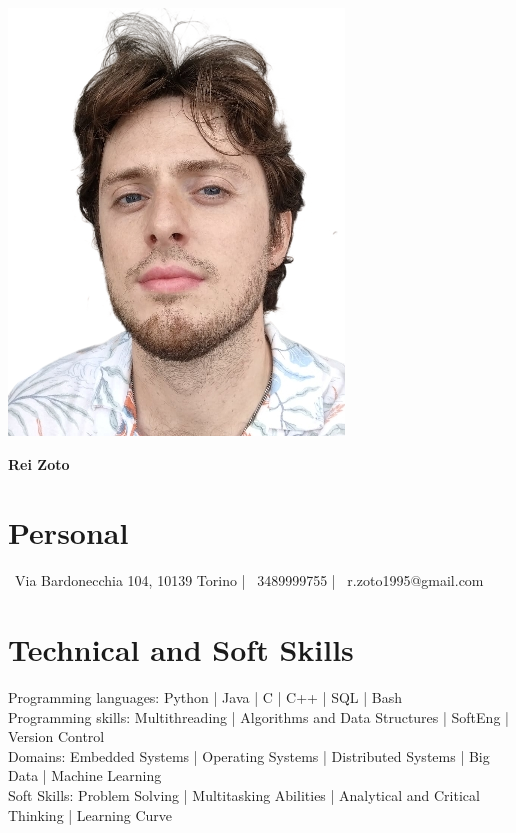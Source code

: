 \documentclass[10.5pt,a4paper]{article}
\begin{document}
\begin{minipage}{0.2\textwidth}
    \includegraphics[width=\linewidth]{propic-crop.png}
\end{minipage}
\hspace{2cm}
\begin{minipage}{0.59\textwidth}
    {\huge\bfseries Rei Zoto}
\end{minipage}

\section*{Personal}
\faMapMarker\ Via Bardonecchia 104, 10139 Torino \hspace{1em} | \hspace{1em}
\faMobile\ 3489999755 \hspace{1em} | \hspace{1em}
\faEnvelope\ r.zoto1995@gmail.com  

\section*{Technical and Soft Skills}
Programming languages: Python | Java | C | C++ | SQL | Bash \\
Programming skills: Multithreading | Algorithms and Data Structures | SoftEng | Version Control \\
Domains: Embedded Systems | Operating Systems | Distributed Systems | Big Data | Machine Learning \\
Soft Skills: Problem Solving | Multitasking Abilities | Analytical and Critical Thinking | Learning Curve
\end{document}
